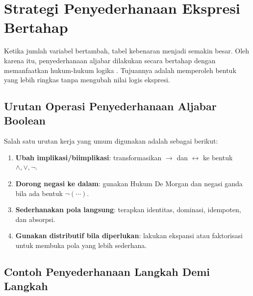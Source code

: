 \section{Strategi Penyederhanaan Ekspresi Bertahap}

Ketika jumlah variabel bertambah, tabel kebenaran menjadi semakin besar. Oleh karena itu, penyederhanaan aljabar dilakukan secara bertahap dengan memanfaatkan hukum-hukum logika \cite{wiki_proplogic,rosen2019}. Tujuannya adalah memperoleh bentuk yang lebih ringkas tanpa mengubah nilai logis ekspresi.

\subsection{Urutan Operasi Penyederhanaan Aljabar Boolean}

Salah satu urutan kerja yang umum digunakan adalah sebagai berikut:
\begin{enumerate}
    \item \textbf{Ubah implikasi/biimplikasi}: transformasikan $\rightarrow$ dan $\leftrightarrow$ ke bentuk $\wedge, \vee, \neg$.
    \item \textbf{Dorong negasi ke dalam}: gunakan Hukum De Morgan dan negasi ganda bila ada bentuk $\neg(\cdots)$.
    \item \textbf{Sederhanakan pola langsung}: terapkan identitas, dominasi, idempoten, dan absorpsi.
    \item \textbf{Gunakan distributif bila diperlukan}: lakukan ekspansi atau faktorisasi untuk membuka pola yang lebih sederhana.
\end{enumerate}

\subsection{Contoh Penyederhanaan Langkah Demi Langkah}

